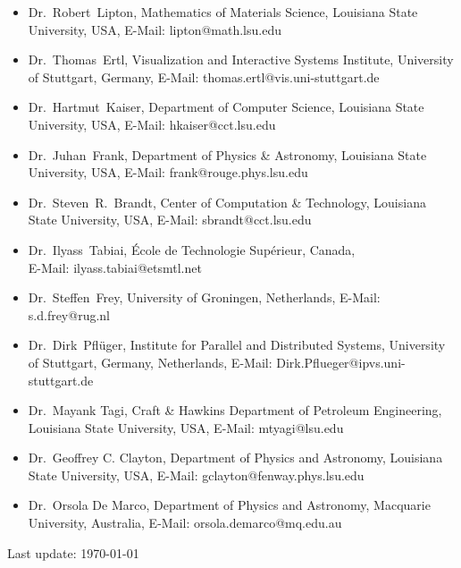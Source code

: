 \documentclass[11pt,a4paper,sans]{moderncv}
\begin{document}
\begin{itemize}[leftmargin=4cm]
\item Dr.~Robert~Lipton, Mathematics of Materials Science, Louisiana State University, USA, E-Mail: lipton@math.lsu.edu
\item Dr.~Thomas~Ertl, Visualization and Interactive Systems Institute, University of Stuttgart, Germany, E-Mail: thomas.ertl@vis.uni-stuttgart.de
\item Dr.~Hartmut~Kaiser, Department of Computer Science, Louisiana State University, USA, E-Mail: hkaiser@cct.lsu.edu
\item Dr.~Juhan~Frank, Department of Physics \& Astronomy, Louisiana State University, USA, E-Mail: frank@rouge.phys.lsu.edu
\item Dr.~Steven~R.~Brandt, Center of Computation \& Technology, Louisiana State University, USA, E-Mail: sbrandt@cct.lsu.edu
\item Dr.~Ilyass~Tabiai, École de Technologie Supérieur, Canada, \\E-Mail: ilyass.tabiai@etsmtl.net
\item Dr.~Steffen~Frey, University of Groningen, Netherlands, E-Mail: s.d.frey@rug.nl
\item Dr.~Dirk~Pfl\"uger, Institute for Parallel and Distributed Systems, University of Stuttgart, Germany, Netherlands, E-Mail: Dirk.Pflueger@ipvs.uni-stuttgart.de
\item Dr.~Mayank Tagi,  Craft \& Hawkins Department of Petroleum Engineering, Louisiana State University, USA, E-Mail:  mtyagi@lsu.edu
\item Dr.~Geoffrey C. Clayton, Department of Physics and Astronomy, Louisiana State University, USA, E-Mail: gclayton@fenway.phys.lsu.edu 
\item Dr.~Orsola De Marco, Department of Physics and Astronomy, Macquarie University, Australia, E-Mail: orsola.demarco@mq.edu.au
\end{itemize}
\begin{center}
Last update: \today
\end{center}
\end{document}
